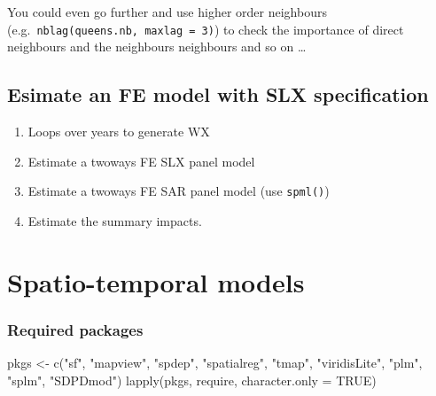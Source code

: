 \documentclass[
  letterpaper,
]{scrbook}
\newenvironment{Shaded}{\begin{snugshade}}{\end{snugshade}}
\newcommand{\AttributeTok}[1]{\textcolor[rgb]{0.40,0.45,0.13}{#1}}
\newcommand{\ConstantTok}[1]{\textcolor[rgb]{0.56,0.35,0.01}{#1}}
\newcommand{\FunctionTok}[1]{\textcolor[rgb]{0.28,0.35,0.67}{#1}}
\newcommand{\NormalTok}[1]{\textcolor[rgb]{0.00,0.23,0.31}{#1}}
\newcommand{\OtherTok}[1]{\textcolor[rgb]{0.00,0.23,0.31}{#1}}
\newcommand{\StringTok}[1]{\textcolor[rgb]{0.13,0.47,0.30}{#1}}
\begin{document}
You could even go further and use higher order neighbours
(e.g.~\texttt{nblag(queens.nb,\ maxlag\ =\ 3)}) to check the importance
of direct neighbours and the neighbours neighbours and so on \ldots{}

\hypertarget{esimate-an-fe-model-with-slx-specification}{%
\section{Esimate an FE model with SLX
specification}\label{esimate-an-fe-model-with-slx-specification}}

\begin{enumerate}
\def\labelenumi{\alph{enumi})}
\item
  Loops over years to generate WX
\item
  Estimate a twoways FE SLX panel model
\item
  Estimate a twoways FE SAR panel model (use \texttt{spml()})
\item
  Estimate the summary impacts.
\end{enumerate}


\hypertarget{spatio-temporal-models}{%
\chapter{Spatio-temporal models}\label{spatio-temporal-models}}

\hypertarget{required-packages-11}{%
\subsection*{Required packages}\label{required-packages-11}}

\begin{Shaded}
\begin{Highlighting}[]
\NormalTok{pkgs }\OtherTok{\textless{}{-}} \FunctionTok{c}\NormalTok{(}\StringTok{"sf"}\NormalTok{, }\StringTok{"mapview"}\NormalTok{, }\StringTok{"spdep"}\NormalTok{, }\StringTok{"spatialreg"}\NormalTok{, }\StringTok{"tmap"}\NormalTok{, }\StringTok{"viridisLite"}\NormalTok{, }
          \StringTok{"plm"}\NormalTok{, }\StringTok{"splm"}\NormalTok{, }\StringTok{"SDPDmod"}\NormalTok{)}
\FunctionTok{lapply}\NormalTok{(pkgs, require, }\AttributeTok{character.only =} \ConstantTok{TRUE}\NormalTok{)}
\end{Highlighting}
\end{Shaded}
\end{document}
